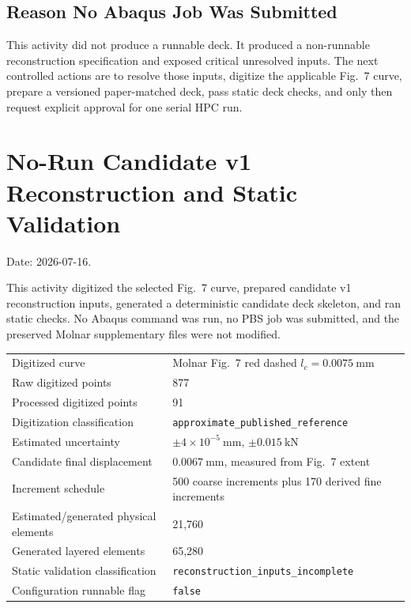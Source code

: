 \documentclass[11pt,a4paper]{article}
\begin{document}
\subsection*{Reason No Abaqus Job Was Submitted}

This activity did not produce a runnable deck. It produced a non-runnable reconstruction specification and exposed critical unresolved inputs. The next controlled actions are to resolve those inputs, digitize the applicable Fig.~7 curve, prepare a versioned paper-matched deck, pass static deck checks, and only then request explicit approval for one serial HPC run.

\section{No-Run Candidate v1 Reconstruction and Static Validation}

Date: 2026-07-16.

This activity digitized the selected Fig.~7 curve, prepared candidate v1 reconstruction inputs, generated a deterministic candidate deck skeleton, and ran static checks. No Abaqus command was run, no PBS job was submitted, and the preserved Molnar supplementary files were not modified.

\begin{tabular}{ll}
\toprule
Digitized curve & Molnar Fig.~7 red dashed \(l_c=0.0075\ \mathrm{mm}\) \\
Raw digitized points & 877 \\
Processed digitized points & 91 \\
Digitization classification & \texttt{approximate\_published\_reference} \\
Estimated uncertainty & \(\pm 4\times10^{-5}\ \mathrm{mm}\), \(\pm 0.015\ \mathrm{kN}\) \\
Candidate final displacement & \(0.0067\ \mathrm{mm}\), measured from Fig.~7 extent \\
Increment schedule & 500 coarse increments plus 170 derived fine increments \\
Estimated/generated physical elements & 21,760 \\
Generated layered elements & 65,280 \\
Static validation classification & \texttt{reconstruction\_inputs\_incomplete} \\
Configuration runnable flag & \texttt{false} \\
\bottomrule
\end{tabular}
\end{document}

